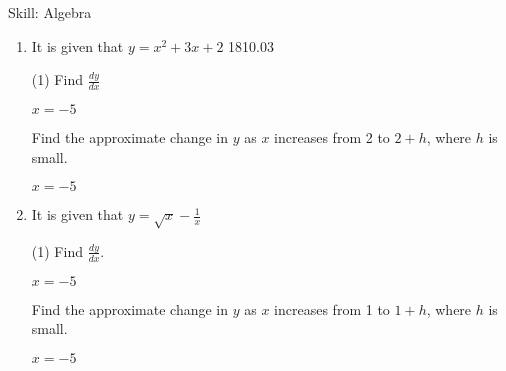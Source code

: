 \begin{bxTip}[colbacktitle=green]{Skill: Algebra}

\begin{enumerate} [leftmargin=0cm] 

\item It is given that $y=x^2+3x +2$   1810.03
\begin{tasks}[label=(\alph*), after-item-skip=2pt,after-skip=3pt, label-width=4ex](1)
    \task  Find $\frac{dy}{dx}$	           \begin{envAnswer}[blankline=3]    $      x=-5                    $ \end{envAnswer}
	\task  Find the approximate change in $y$ as $x$ increases from 2 to $2+ h$, where $h$ is small. 
	                                       \begin{envAnswer}[blankline=3]    $      x=-5                    $ \end{envAnswer}
 
\end{tasks}

\item It is given that $y=\sqrt{x} - \frac{1}{x}$
\begin{tasks}[label=(\alph*), after-item-skip=2pt,after-skip=3pt, label-width=4ex](1)
    \task  Find $\frac{dy}{dx}$.	           \begin{envAnswer}[blankline=3]    $      x=-5                    $ \end{envAnswer}
	\task  Find the approximate change in $y$ as $x$ increases from 1 to $1+ h$, where $h$ is small. 
	                                  \begin{envAnswer}[blankline=3]    $      x=-5                    $ \end{envAnswer}

\end{tasks}



\end{enumerate}

\end{bxTip}






\clearpage





